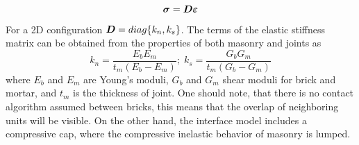 \documentclass[a4paper]{article}
\newcommand{\mbf}[1]{\mbox{\boldmath$#1$}}
\newcommand{\del}[2]{\mbox{$\displaystyle\frac{#1}{#2}$}}
\newcommand{\e}{\mbf{\varepsilon}}
\newcommand{\sig}{\mbf{\sigma}}
\begin{document}
\begin{equation}
  \sig=\mbf{D}\e
\end{equation}
For a 2D configuration $\mbf{D}=diag\{k_n,k_s\}$. The terms of the elastic stiffness matrix can be obtained from the properties of both masonry and joints as
\begin{equation}
  k_n=\del{E_bE_m}{t_m(E_b-E_m)};\;k_s=\del{G_bG_m}{t_m(G_b-G_m)}
\end{equation}
where $E_b$ and $E_m$ are Young's moduli, $G_b$ and $G_m$ shear moduli for brick and mortar, and $t_m$ is the thickness of joint. One should note, that there is no contact algorithm assumed between bricks, this means that the overlap of neighboring units will be visible. On the other hand, the interface model includes a compressive cap, where the compressive inelastic behavior of masonry is lumped.
\end{document}
